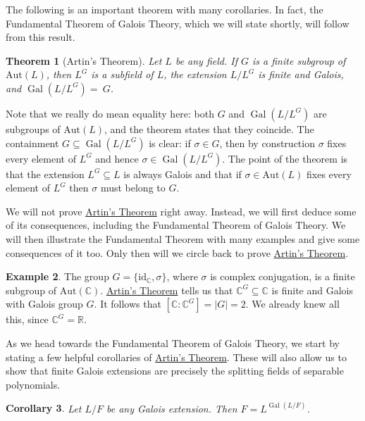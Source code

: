\documentclass[12pt]{report}
\newtheorem{theorem}{Theorem}[chapter]
\newtheorem{corollary}[theorem]{Corollary}
\numberwithin{equation}{section}
\numberwithin{theorem}{chapter}
\theoremstyle{definition}
\newtheorem{example}[theorem]{Example}
\newtheorem*{basic properties}{Basic Properties}
\newtheorem*{Important Remark}{Important Remark}
\DeclareMathOperator{\Gal}{Gal}
\newcommand{\C}{\mathbb{C}}
\begin{document}
The following is an important theorem with many corollaries. In fact, the Fundamental Theorem of Galois Theory, which we will state shortly, will follow from this result.


\begin{theorem}[Artin's Theorem] \label{Artin's theorem}
Let $L$ be any field. If $G$ is a finite subgroup of $\mathrm{Aut}(L)$, then $L^G$ is a subfield of $L$, the extension $L/L^G$ is finite and Galois, and $\Gal(L/L^G) =~G$.
\end{theorem}

Note that we really do mean equality here: both $G$ and $\Gal(L/L^G)$ are subgroups of $\mathrm{Aut}(L)$, and the theorem states that they coincide. The containment $G \subseteq \Gal(L/L^G)$ is clear: if $\sigma \in G$, then by construction $\sigma$ fixes every element of $L^G$ and hence $\sigma \in \Gal(L/L^G)$. The point of the theorem is that the extension $L^G \subseteq L$ is always Galois and that if $\sigma \in \mathrm{Aut}(L)$ fixes every element of $L^G$ then $\sigma$ must belong to $G$.

We will not prove \hyperref[Artin's theorem]{Artin's Theorem} right away. Instead, we will first deduce some of its consequences, including the Fundamental Theorem of Galois Theory. We will then illustrate the Fundamental Theorem with many examples and give some consequences of it too. Only then will we circle back to prove \hyperref[Artin's theorem]{Artin's Theorem}.

\begin{example} 
The group $G = \{\mathrm{id}_{\C}, \sigma \}$, where $\sigma$ is complex conjugation, is a finite subgroup of $\mathrm{Aut}(\C)$. \hyperref[Artin's theorem]{Artin's Theorem} tells us that $\C^G \subseteq \C$ is finite and Galois with Galois group $G$. It follows that $[\C : \C^G] = |G| = 2$. We already knew all this, since $\C^G = \mathbb{R}$.
\end{example}

As we head towards the Fundamental Theorem of Galois Theory, we start by stating a few helpful corollaries of \hyperref[Artin's theorem]{Artin's Theorem}. These will also allow us to show that finite Galois extensions are precisely the splitting fields of separable polynomials.



\begin{corollary}\label{galois extension base is exactly the fixed points}
 Let $L/F$ be any Galois extension. Then $F = L^{\Gal(L/F)}$.
\end{corollary}
\end{document}
